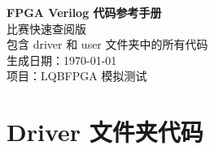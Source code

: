 \documentclass[a4paper,10pt]{article}
\begin{document}
\begin{titlepage}
\begin{center}
\vspace*{2cm}
{\Huge\bfseries FPGA Verilog 代码参考手册}\\[1cm]
{\Large 比赛快速查阅版}\\[2cm]
{\large 包含 driver 和 user 文件夹中的所有代码}\\[1cm]
{\large 生成日期：\today}\\[3cm]
{\large 项目：LQBFPGA 模拟测试}
\end{center}
\end{titlepage}

\tableofcontents
\newpage

\section{Driver 文件夹代码}
\end{document}
